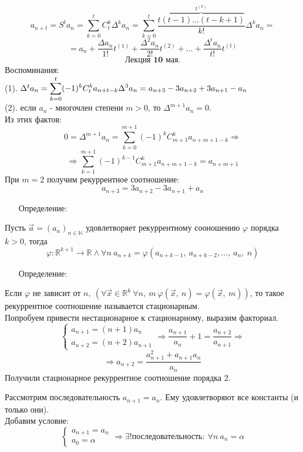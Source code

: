 \documentclass[12pt, letterpaper, twoside]{article}
\newcommand{\DS}{\displaystyle}
\newcommand{\mb}[1]{\mathbb{#1}}
\begin{document}
\[a_{n + t} = S^ta_n = \sum_{k = 0}^{t} C_t^k \Delta^k a_n = \sum_{k = 0}^t \frac{\overset{t^{(k)}}{\overbrace{t(t - 1)\dots(t - k + 1)}}}{k!}\Delta^k a_n =\]
\[= a_n + \frac{\Delta a_n}{1!}t^{(1)} + \frac{\Delta^2 a_n}{2!}t^{(2)} + \dots + \frac{\Delta^t a_n}{t!} t^{(t)}\]
\[\textbf{Лекция 10 мая.}\]
Воспоминания:\\
(1). $\Delta^t a_n = \DS \sum_{k = 0}^{t}(-1)^k C_t^k a_{n + t - k}\\
\Delta^3 a_n = a_{n + 3} - 3 a_{n + 2} + 3a_{n + 1} - a_n$\\
(2). если $a_n$ - многочлен степени $m > 0$, то $\Delta^{m + 1} a_n = 0$.\\
Из этих фактов:
\[0 = \Delta^{m + 1} a_n = \sum_{k = 0}^{m + 1} (-1)^k C_{m + 1}^{k} a_{n + m + 1 - k}\Rightarrow\]
\[\Rightarrow \sum_{k = 1}^{m + 1} (-1)^{k - 1} C^k_{m + 1} a_{n + m + 1 - k} = a_{n + m + 1}\]
При $m = 2$ получим рекуррентное соотношение:
\[a_{n + 3} = 3a_{n + 2} - 3a_{n + 1} + a_n\]
\begin{enumerate}
    \item[Определение:]
\end{enumerate}
Пусть $\vec{a} = (a_n)_{n\in \mb{N}}$ удовлетворяет рекуррентному сооношению $\varphi$ порядка $k > 0$, тогда
\[\varphi: \mb{R}^{k + 1}\to \mb{R}\wedge \forall n\ a_{n + k} = \varphi(a_{n + k - 1},\ a_{n + k - 2},\dots,\ a_n,\ n)\]
\begin{enumerate}
    \item[Определение:]
\end{enumerate}
Если $\varphi$ не зависит от $n,\ \left(\forall \vec{x} \in \mb{R}^k\ \forall n,\ m\ \varphi(\vec{x},\ n) = \varphi(\vec{x},\ m)\right)$, то такое рекуррентное соотношение называется стационарным.\\
Попробуем привести нестационарное к стационарному, выразим факториал.
\[\begin{cases}
    a_{n + 1} = (n + 1)a_n\\
    a_{n + 2} = (n + 2)a_{n + 1}
\end{cases}\Rightarrow \frac{a_{n + 1}}{a_n} + 1 = \frac{a_{n + 2}}{a_{n + 1}}\Rightarrow\]
\[\Rightarrow a_{n + 2} = \frac{a_{n + 1}^2 + a_{n + 1}a_n}{a_n}\]
Получили стационарное рекуррентное соотношение порядка 2.\par
Рассмотрим последовательность $a_{n + 1} = a_n$. Ему удовлетворяют все константы (и только они).\\
Добавим условие:
\[\begin{cases}
    a_{n + 1} = a_n\\
    a_0 = \alpha
\end{cases}\Rightarrow \exists! \text{последовательность}:\ \forall n\ a_n = \alpha\]
\end{document}
